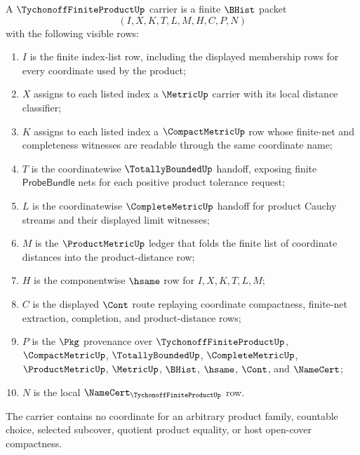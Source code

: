 \begin{definition}
\label{def:tychonoff-finite-product-carrier}
A $\TychonoffFiniteProductUp$ carrier is a finite $\BHist$ packet
$$
(I,X,K,T,L,M,H,C,P,N)
$$
with the following visible rows:
\begin{enumerate}
\item $I$ is the finite index-list row, including the displayed membership rows for every coordinate used by the product;
\item $X$ assigns to each listed index a $\MetricUp$ carrier with its local distance classifier;
\item $K$ assigns to each listed index a $\CompactMetricUp$ row whose finite-net and completeness witnesses are readable through the same coordinate name;
\item $T$ is the coordinatewise $\TotallyBoundedUp$ handoff, exposing finite $\mathsf{ProbeBundle}$ nets for each positive product tolerance request;
\item $L$ is the coordinatewise $\CompleteMetricUp$ handoff for product Cauchy streams and their displayed limit witnesses;
\item $M$ is the $\ProductMetricUp$ ledger that folds the finite list of coordinate distances into the product-distance row;
\item $H$ is the componentwise $\hsame$ row for $I,X,K,T,L,M$;
\item $C$ is the displayed $\Cont$ route replaying coordinate compactness, finite-net extraction, completion, and product-distance rows;
\item $P$ is the $\Pkg$ provenance over $\TychonoffFiniteProductUp$, $\CompactMetricUp$, $\TotallyBoundedUp$, $\CompleteMetricUp$, $\ProductMetricUp$, $\MetricUp$, $\BHist$, $\hsame$, $\Cont$, and $\NameCert$;
\item $N$ is the local $\NameCert_{\TychonoffFiniteProductUp}$ row.
\end{enumerate}
The carrier contains no coordinate for an arbitrary product family, countable choice, selected subcover, quotient product equality, or host open-cover compactness.
\end{definition}

